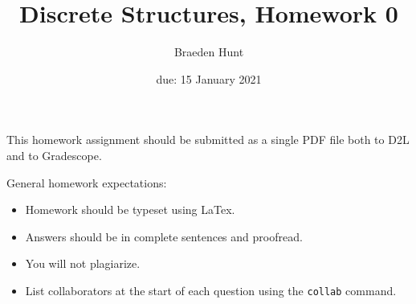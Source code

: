 \documentclass{article}
\title{Discrete Structures, Homework 0}
\author{Braeden Hunt}
\date{due: 15 January 2021}
\begin{document}
\maketitle

This homework assignment should be
submitted as a single PDF file both to D2L and to Gradescope.

General homework expectations:
\begin{itemize}
    \item Homework should be typeset using LaTex.
    \item Answers should be in complete sentences and proofread.
    \item You will not plagiarize.
    \item List collaborators at the start of each question using the
        \texttt{collab} command.
\end{itemize}

\end{document}
